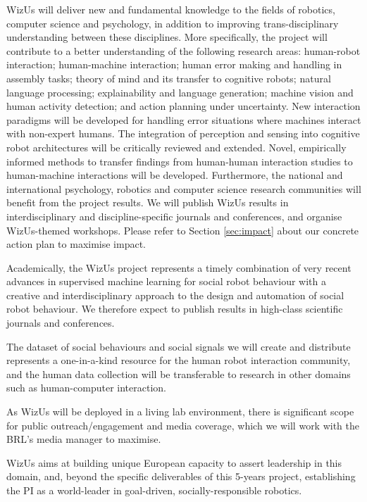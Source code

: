 \documentclass[11pt,a4paper]{report}
\newcommand{\project}{WizUs\xspace}
\begin{document}
\project will deliver new and fundamental knowledge to the fields of robotics,
computer science and psychology, in addition to improving trans-disciplinary
understanding between these disciplines. More specifically, the project will
contribute to a better understanding of the following research areas:
human-robot interaction; human-machine interaction; human error making and
handling in assembly tasks; theory of mind and its transfer to cognitive robots;
natural language processing; explainability and language generation; machine
vision and human activity detection; and action planning under uncertainty. New
interaction paradigms will be developed for handling error situations where
machines interact with non-expert humans. The integration of perception and
sensing into cognitive robot architectures will be critically reviewed and
extended. Novel, empirically informed methods to transfer findings from
human-human interaction studies to human-machine interactions will be developed.
Furthermore, the national and international psychology, robotics and computer
science research communities will benefit from the project results. We will
publish \project results in interdisciplinary and discipline-specific journals
and conferences, and organise \project-themed workshops. Please refer to Section
\ref{sec:impact} about our concrete action plan to maximise impact. 




Academically, the \project project represents a timely combination of
very recent advances in supervised machine learning for social robot
behaviour with a creative and interdisciplinary approach to the design
and automation of social robot behaviour. We therefore expect to publish
results in high-class scientific journals and conferences.

The dataset of social behaviours and social signals we will create and
distribute represents a one-in-a-kind resource for the human robot
interaction community, and the human data collection will be
transferable to research in other domains such as human-computer
interaction.

As \project will be deployed in a living lab environment, there is
significant scope for public outreach/engagement and media coverage,
which we will work with the BRL's media manager to maximise.



\project aims at building unique European capacity to assert leadership in this
domain, and, beyond the specific deliverables of this 5-years project,
establishing the PI as a world-leader in goal-driven, socially-responsible
robotics.
\end{document}
